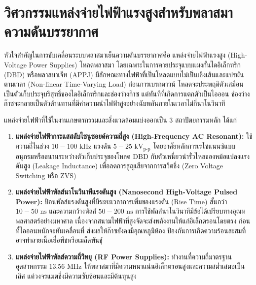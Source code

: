 \clearpage


\section{วิศวกรรมแหล่งจ่ายไฟฟ้าแรงสูงสำหรับพลาสมาความดันบรรยากาศ}

หัวใจสำคัญในการขับเคลื่อนระบบพลาสมาเย็นความดันบรรยากาศคือ แหล่งจ่ายไฟฟ้าแรงสูง (High-Voltage Power Supplies) โหลดพลาสมา โดยเฉพาะในการคายประจุแบบแผงกั้นไดอิเล็กทริก (DBD) หรือพลาสมาเจ็ท (APPJ) มีลักษณะทางไฟฟ้าที่เป็นโหลดแบบไม่เป็นเชิงเส้นและแปรผันตามเวลา (Non-linear Time-Varying Load) ก่อนการเบรกดาวน์ โหลดจะประพฤติตัวเสมือนเป็นตัวเก็บประจุบริสุทธิ์ของไดอิเล็กทริกและช่องว่างก๊าซ แต่ทันทีที่เกิดการแตกตัวเป็นไอออน ช่องว่างก๊าซจะกลายเป็นตัวต้านทานที่มีค่าความนำไฟฟ้าสูงอย่างฉับพลันภายในเวลาไม่กี่นาโนวินาที

แหล่งจ่ายไฟฟ้าที่ใช้ในงานเกษตรกรรมและสิ่งแวดล้อมแบ่งออกเป็น 3 สถาปัตยกรรมหลัก ได้แก่

\begin{enumerate}
    \item \textbf{แหล่งจ่ายไฟฟ้ากระแสสลับไซนูซอยด์ความถี่สูง (High-Frequency AC Resonant):} ใช้ความถี่ในช่วง $10 - 100 \text{ kHz}$ แรงดัน $5 - 25 \text{ kV}_{\text{p-p}}$ โดยอาศัยหลักการเรโซแนนซ์แบบอนุกรมหรือขนานระหว่างตัวเก็บประจุของโหลด DBD กับตัวเหนี่ยวนำรั่วไหลของหม้อแปลงแรงดันสูง (Leakage Inductance) เพื่อลดการสูญเสียจากการสวิตชิ่ง (Zero Voltage Switching หรือ ZVS)
    
    \item \textbf{แหล่งจ่ายไฟฟ้าพัลส์นาโนวินาทีแรงดันสูง (Nanosecond High-Voltage Pulsed Power):} ป้อนพัลส์แรงดันสูงที่มีระยะเวลาการเพิ่มของแรงดัน (Rise Time) สั้นกว่า $10 - 50 \text{ ns}$ และความกว้างพัลส์ $50 - 200 \text{ ns}$ การใช้พัลส์นาโนวินาทีมีข้อได้เปรียบทางอุณหพลศาสตร์อย่างมหาศาล เนื่องจากสนามไฟฟ้าที่สูงจัดจะส่งพลังงานให้แก่อิเล็กตรอนโดยตรง ก่อนที่ไอออนหนักจะทันเคลื่อนที่ ส่งผลให้ก๊าซยังคงมีอุณหภูมิห้อง ป้องกันการเกิดความร้อนสะสมที่อาจทำลายเนื้อเยื่อพืชหรือเมล็ดพันธุ์
    
    \item \textbf{แหล่งจ่ายไฟฟ้าพัลส์ความถี่วิทยุ (RF Power Supplies):} ทำงานที่ความถี่มาตรฐานอุตสาหกรรม $13.56 \text{ MHz}$ ให้พลาสมาที่มีความหนาแน่นอิเล็กตรอนสูงและความสม่ำเสมอเป็นเลิศ แต่วงจรแมตชิ่งมีความซับซ้อนและมีต้นทุนสูง
\end{enumerate}


